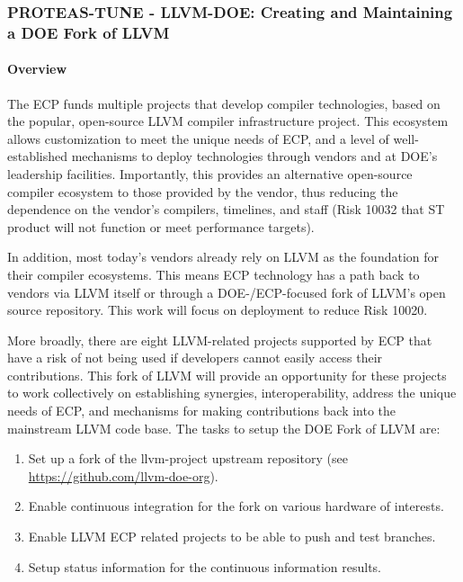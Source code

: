 \subsubsection{ PROTEAS-TUNE - LLVM-DOE: Creating and Maintaining a DOE Fork of LLVM}\label{s:llvm-doe}

\paragraph{Overview}

The ECP funds multiple projects that develop compiler technologies, based on the
popular, open-source LLVM compiler infrastructure project. This ecosystem allows
customization to meet the unique needs of ECP, and a level of well-established
mechanisms to deploy technologies through vendors and at DOE’s leadership
facilities. Importantly, this provides an alternative open-source compiler
ecosystem to those provided by the vendor, thus reducing the dependence on the
vendor’s compilers, timelines, and staff (Risk 10032 that ST product will not
function or meet performance targets).

In addition, most today’s vendors already rely on LLVM as the foundation for
their compiler ecosystems. This means ECP technology has a path back to vendors
via LLVM itself or through a DOE-/ECP-focused fork of LLVM’s open source
repository. This work will focus on deployment to reduce Risk 10020.

More broadly, there are eight LLVM-related projects supported by ECP that have
a risk of not being used if developers cannot easily access their contributions.
This fork of LLVM will provide an opportunity for these projects to work
collectively on establishing synergies, interoperability, address the unique
needs of ECP, and mechanisms for making contributions back into the mainstream
LLVM code base. The tasks to setup the DOE Fork of LLVM are:

\begin{enumerate}

\item Set up a fork of the llvm-project upstream repository (see \url{https://github.com/llvm-doe-org}).

\item Enable continuous integration for the fork on various hardware of
      interests.

\item Enable LLVM ECP related projects to be able to push and test branches.

\item Setup status information for the continuous information results.

\end{enumerate}


